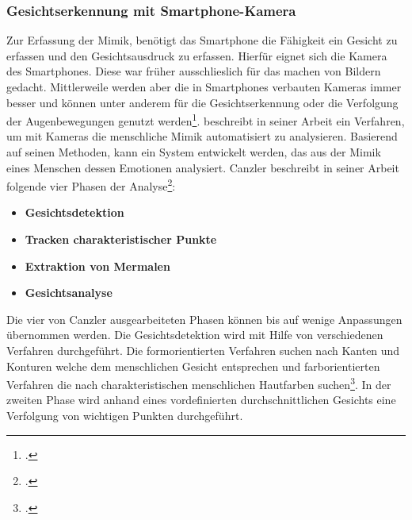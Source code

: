\subsubsection{Gesichtserkennung mit Smartphone-Kamera}
Zur Erfassung der Mimik, benötigt das Smartphone die Fähigkeit ein Gesicht zu erfassen und den Gesichtsausdruck zu erfassen. Hierfür eignet sich  die Kamera des Smartphones. Diese war früher ausschlieslich für das machen von Bildern gedacht. Mittlerweile werden aber die in Smartphones verbauten Kameras immer besser und können unter anderem für die Gesichtserkennung oder die Verfolgung der Augenbewegungen genutzt werden\footcite[Vgl. ][Seite 2 Kamera Abs. 1+2]{Bie14}.\newline %
\cite{Can01} beschreibt in seiner Arbeit ein Verfahren, um mit Kameras die menschliche Mimik automatisiert zu analysieren. Basierend auf seinen Methoden, kann ein System entwickelt werden, das aus der Mimik eines Menschen dessen Emotionen analysiert. Canzler beschreibt in seiner Arbeit folgende vier Phasen der Analyse\footcite[Vgl. ][S.2-5]{Can01}:
\begin{itemize}
	\item[1.] \textbf{Gesichtsdetektion}
	\item[2.] \textbf{Tracken charakteristischer Punkte}
	\item[3.] \textbf{Extraktion von Mermalen}%
	\item[4.] \textbf{Gesichtsanalyse}
\end{itemize}
Die vier von Canzler ausgearbeiteten Phasen können bis auf wenige Anpassungen übernommen werden. Die Gesichtsdetektion wird mit Hilfe von verschiedenen Verfahren durchgeführt. Die formorientierten Verfahren suchen nach Kanten und Konturen welche dem menschlichen Gesicht entsprechen und farborientierten Verfahren die nach charakteristischen menschlichen Hautfarben suchen\footcite[Vgl. ][S.2 Z.14ff]{Can01}. In der zweiten Phase wird anhand eines vordefinierten durchschnittlichen Gesichts eine Verfolgung von wichtigen Punkten durchgeführt. %
